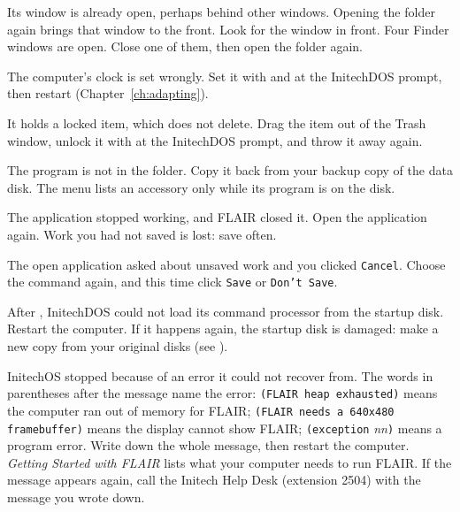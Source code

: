 \Cause Its window is already open, perhaps behind other windows.  Opening
the folder again brings that window to the front.
\Solution Look for the window in front.
\Cause Four Finder windows are open.
\Solution Close one of them, then open the folder again.

\Cause The computer's clock is set wrongly.
\Solution Set it with  and  at the InitechDOS
prompt, then restart (Chapter~\ref{ch:adapting}).

\Cause It holds a locked item, which  does not
delete.
\Solution Drag the item out of the Trash window, unlock it with
 at the InitechDOS prompt, and throw it away again.

\Cause The program  is not in the  folder.
\Solution Copy it back from your backup copy of the data disk.  The menu
lists an accessory only while its program is on the disk.

\Cause The application stopped working, and FLAIR closed it.
\Solution Open the application again.  Work you had not saved is lost:
save often.

\Cause The open application asked about unsaved work and you clicked
\texttt{Cancel}.
\Solution Choose the command again, and this time click \texttt{Save} or
\texttt{Don't Save}.

\Cause After , InitechDOS could not load its
command processor from the startup disk.
\Solution Restart the computer.  If it happens again, the startup disk is
damaged: make a new copy from your original disks (see ).

\Cause InitechOS stopped because of an error it could not recover from.
The words in parentheses after the message name the error:
\texttt{(FLAIR heap exhausted)} means the computer ran out of memory for
FLAIR; \texttt{(FLAIR needs a 640x480 framebuffer)} means the display cannot
show FLAIR; \texttt{(exception} \textit{nn}\texttt{)} means a program
error.
\Solution Write down the whole message, then restart the computer.
\textit{Getting Started with FLAIR} lists what your computer needs to run
FLAIR.  If the message appears again, call the Initech Help Desk
(extension 2504) with the message you wrote down.
